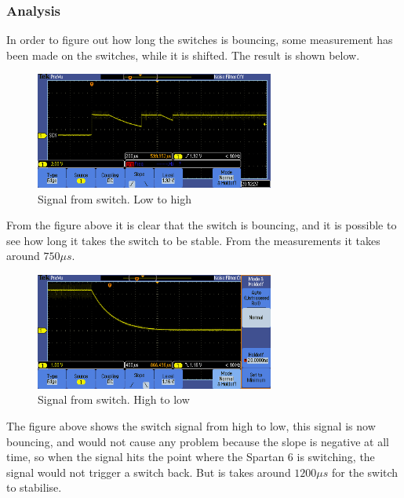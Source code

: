 \subsubsection{Analysis}
%
%
In order to figure out how long the switches is bouncing, some measurement has been made on the switches, while it is shifted. The result is shown below.
\begin{figure}[H]
	\begin{centering}
		\includegraphics[width=0.7\textwidth]{images/debon_LtoH.png}
		\caption{Signal from switch. Low to high}
	\end{centering}
\end{figure}
From the figure above it is clear that the switch is bouncing, and it is possible to see how long it takes the switch to be stable. From the measurements it takes around $750\mu s$.
\begin{figure}[H]
	\begin{centering}
		\includegraphics[width=0.7\textwidth]{images/debon_HtoL.png}
		\caption{Signal from switch. High to low}
	\end{centering}
\end{figure}
The figure above shows the switch signal from high to low, this signal is now bouncing, and would not cause any problem because the slope is negative at all time, so when the signal hits the point where the Spartan 6 is switching, the signal would not trigger a switch back. But is takes around $1200\mu s$ for the switch to stabilise.

